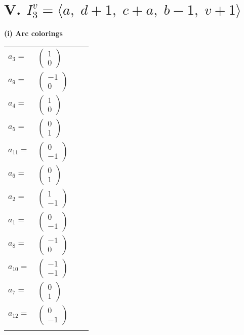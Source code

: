 \documentclass[1p]{elsarticle_modified}
\theoremstyle{definition}
\begin{document}
\centering \section*{V. $I^v_{3}= \langle a,\;d+1,\;c+a,\;b-1,\;v+1 \rangle$}
\flushleft \textbf{(i) Arc colorings}\\
\begin{tabular}{m{7pt} m{180pt} m{7pt} m{180pt} }
\flushright $a_{3}=$&$\begin{pmatrix}1\\0\end{pmatrix}$ \\
\flushright $a_{9}=$&$\begin{pmatrix}-1\\0\end{pmatrix}$ \\
\flushright $a_{4}=$&$\begin{pmatrix}1\\0\end{pmatrix}$ \\
\flushright $a_{5}=$&$\begin{pmatrix}0\\1\end{pmatrix}$ \\
\flushright $a_{11}=$&$\begin{pmatrix}0\\-1\end{pmatrix}$ \\
\flushright $a_{6}=$&$\begin{pmatrix}0\\1\end{pmatrix}$ \\
\flushright $a_{2}=$&$\begin{pmatrix}1\\-1\end{pmatrix}$ \\
\flushright $a_{1}=$&$\begin{pmatrix}0\\-1\end{pmatrix}$ \\
\flushright $a_{8}=$&$\begin{pmatrix}-1\\0\end{pmatrix}$ \\
\flushright $a_{10}=$&$\begin{pmatrix}-1\\-1\end{pmatrix}$ \\
\flushright $a_{7}=$&$\begin{pmatrix}0\\1\end{pmatrix}$ \\
\flushright $a_{12}=$&$\begin{pmatrix}0\\-1\end{pmatrix}$\\&\end{tabular}
\end{document}
